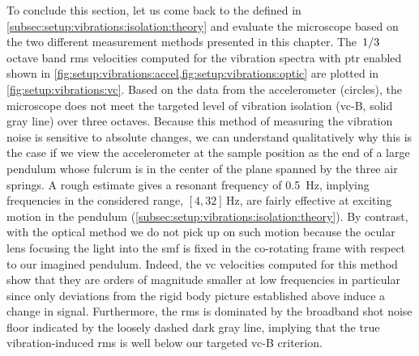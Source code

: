 To conclude this section, let us come back to the  defined in \cref{subsec:setup:vibrations:isolation:theory} and evaluate the microscope based on the two different measurement methods presented in this chapter.
The $\flatfrac{1}{3}$ octave band \gls{rms} velocities computed for the vibration spectra with \gls{ptr} enabled shown in \cref{fig:setup:vibrations:accel,fig:setup:vibrations:optic} are plotted in \cref{fig:setup:vibrations:vc}.
Based on the data from the accelerometer (circles), the microscope does not meet the targeted level of vibration isolation (\acrshort{vc}-B, solid gray line) over three octaves.
Because this method of measuring the vibration noise is sensitive to absolute changes, we can understand qualitatively why this is the case if we view the accelerometer at the sample position as the end of a large pendulum whose fulcrum is in the center of the plane spanned by the three air springs.
A rough estimate gives a resonant frequency of \qty{0.5}{\hertz},
implying frequencies in the considered range, $[4, 32]\,\unit{\hertz}$, are fairly effective at exciting motion in the pendulum (\cf \cref{subsec:setup:vibrations:isolation:theory}).
By contrast, with the optical method we do not pick up on such motion because the ocular lens focusing the light into the \gls{smf} is fixed in the co-rotating frame with respect to our imagined pendulum.
Indeed, the \gls{vc} velocities computed for this method show that they are orders of magnitude smaller at low frequencies in particular since only deviations from the rigid body picture established above induce a change in signal.
Furthermore, the \gls{rms} is dominated by the broadband shot noise floor indicated by the loosely dashed dark gray line, implying that the true vibration-induced \gls{rms} is well below our targeted \acrshort{vc}-B criterion.

